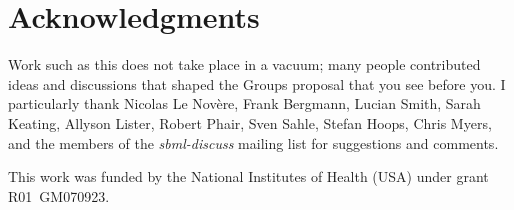 
\section{Acknowledgments}

Work such as this does not take place in a vacuum; many people contributed ideas and discussions that shaped the Groups proposal that you see before you.  I particularly thank Nicolas Le Nov\`{e}re, Frank Bergmann, Lucian Smith, Sarah Keating, Allyson Lister, Robert Phair, Sven Sahle, Stefan Hoops, Chris Myers, and the members of the \emph{sbml-discuss} mailing list for suggestions and comments.

This work was funded by the National Institutes of Health (USA) under grant R01~GM070923.
